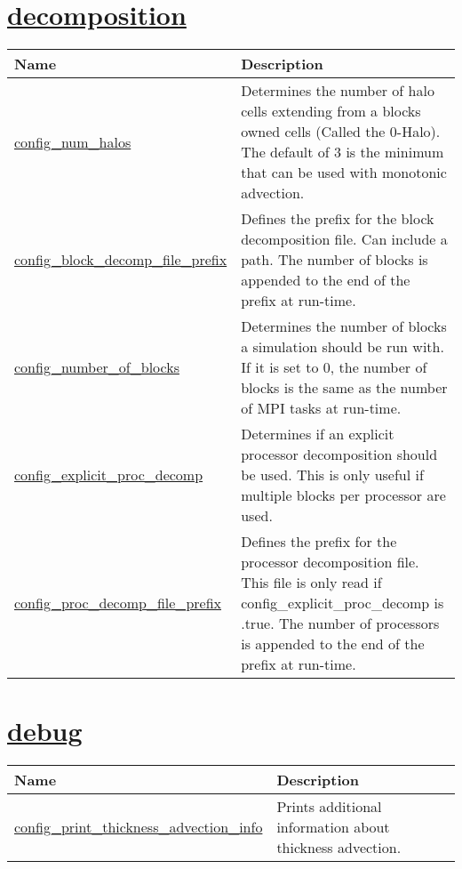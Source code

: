 \section[decomposition]{\hyperref[sec:nm_sec_decomposition]{decomposition}}
\label{sec:nm_tab_decomposition}

{\small
\begin{center}
\begin{longtable}{| p{2.0in} || p{4.0in} |}
	\hline
	{\bf Name} & {\bf Description} \\
	\hline
	\hline
	\hyperref[subsec:nm_sec_config_num_halos]{config\_num\_halos} & Determines the number of halo cells extending from a blocks owned cells (Called the 0-Halo). The default of 3 is the minimum that can be used with monotonic advection. \\
	\hline
	\hyperref[subsec:nm_sec_config_block_decomp_file_prefix]{config\_block\_decomp\_file\_prefix} & Defines the prefix for the block decomposition file. Can include a path. The number of blocks is appended to the end of the prefix at run-time. \\
	\hline
	\hyperref[subsec:nm_sec_config_number_of_blocks]{config\_number\_of\_blocks} & Determines the number of blocks a simulation should be run with. If it is set to 0, the number of blocks is the same as the number of MPI tasks at run-time. \\
	\hline
	\hyperref[subsec:nm_sec_config_explicit_proc_decomp]{config\_explicit\_proc\_decomp} & Determines if an explicit processor decomposition should be used. This is only useful if multiple blocks per processor are used. \\
	\hline
	\hyperref[subsec:nm_sec_config_proc_decomp_file_prefix]{config\_proc\_decomp\_file\_prefix} & Defines the prefix for the processor decomposition file. This file is only read if config\_explicit\_proc\_decomp is .true. The number of processors is appended to the end of the prefix at run-time. \\
	\hline
\end{longtable}
\end{center}
}
\section[debug]{\hyperref[sec:nm_sec_debug]{debug}}
\label{sec:nm_tab_debug}

{\small
\begin{center}
\begin{longtable}{| p{2.0in} || p{4.0in} |}
	\hline
	{\bf Name} & {\bf Description} \\
	\hline
	\hline
	\hyperref[subsec:nm_sec_config_print_thickness_advection_info]{config\_print\_thickness\_advection\_info} & Prints additional information about thickness advection. \\
	\hline
\end{longtable}
\end{center}
}
